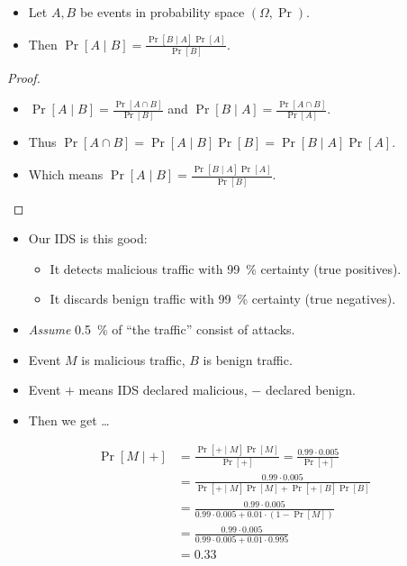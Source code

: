 \begin{theorem}
  \begin{itemize}
    \item Let \(A, B\) be events in probability space \((\Omega, \Pr)\).
    \item Then \(
        \Pr[A\mid B] = \frac{\Pr[B\mid A]\Pr[A]}{\Pr[B]}.
      \)
  \end{itemize}
\end{theorem}

\begin{proof}
  \begin{itemize}
    \item \(\Pr[A\mid B] = \frac{\Pr[A\cap B]}{\Pr[B]}\) and \(\Pr[B\mid A] 
        = \frac{\Pr[A\cap B]}{\Pr[A]}\).

    \item Thus \(\Pr[A\cap B] = \Pr[A\mid B] \Pr[B] = \Pr[B\mid A] \Pr[A]\).

    \item Which means \(\Pr[A\mid B] = \frac{\Pr[B\mid A] \Pr[A]}{\Pr[B]}\).
  \end{itemize}
\end{proof}

\begin{example}
  \begin{itemize}
    \item Our IDS is this good:
      \begin{itemize}
        \item It detects malicious traffic with \SI{99}{\percent} certainty 
          (true positives).
        \item It discards benign traffic with \SI{99}{\percent} certainty (true 
          negatives).
      \end{itemize}

    \item \emph{Assume} \SI{0.5}{\percent} of \enquote{the traffic} consist of 
      attacks.

    \item Event \(M\) is malicious traffic, \(B\) is benign traffic.
    \item Event \(+\) means IDS declared malicious, \(-\) declared benign.

    \item Then we get \dots
  \end{itemize}
\end{example}

\begin{example}
  \begin{align*}
    \Pr[M\mid +] &= \frac{\Pr[+\mid M] \Pr[M]}{\Pr[+]}
    = \frac{0.99\cdot 0.005}{\Pr[+]} \\
    &= \frac{0.99\cdot 0.005}{\Pr[+\mid M] \Pr[M] + \Pr[+\mid B] \Pr[B]} 
    \\
    &= \frac{0.99\cdot 0.005}{0.99\cdot 0.005 + 0.01\cdot (1 - \Pr[M])} 
    \\
    &= \frac{0.99\cdot 0.005}{0.99\cdot 0.005 + 0.01\cdot 0.995} \\
    &= 0.33
  \end{align*}
\end{example}

